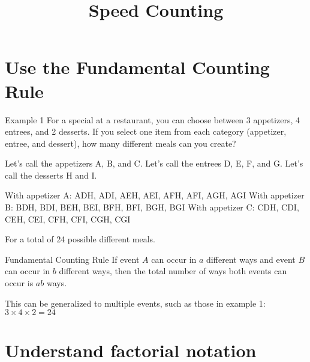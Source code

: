 \documentclass[t]{beamer}
\title{Speed Counting}
\author{}
\date{}
\begin{document}
\begin{frame} 
\maketitle
\end{frame}

\section{Use the Fundamental Counting Rule}

\begin{frame}{Example 1}
For a special at a restaurant, you can choose between 3 appetizers, 4 entrees, and 2 desserts. If you select one item from each category (appetizer, entree, and dessert), how many different meals can you create?	\newline\\	\pause

Let's call the appetizers A, B, and C. \newline \pause
Let's call the entrees D, E, F, and G. \newline \pause
Let's call the desserts H and I.	\newline\\	\pause

With appetizer A: ADH, ADI, AEH, AEI, AFH, AFI, AGH, AGI \newline \pause
With appetizer B: BDH, BDI, BEH, BEI, BFH, BFI, BGH, BGI \newline \pause
With appetizer C: CDH, CDI, CEH, CEI, CFH, CFI, CGH, CGI \newline\\ \pause

For a total of 24 possible different meals.
\end{frame}

\begin{frame}{Fundamental Counting Rule}
If event $A$ can occur in $a$ different ways and event $B$ can occur in $b$ different ways, then the total number of ways both events can occur is $ab$ ways.	\newline\\	\pause

This can be generalized to multiple events, such as those in example 1: $3 \times 4 \times 2 = 24$
\end{frame}


\section{Understand factorial notation}
\end{document}
